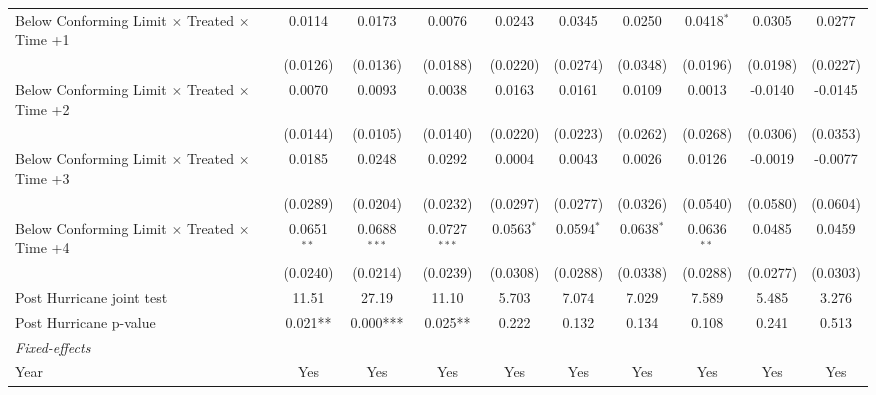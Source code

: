 \begin{tabular}{lccccccccc}
   Below Conforming Limit $\times$ Treated $\times$ Time +1   & 0.0114        & 0.0173         & 0.0076         & 0.0243       & 0.0345       & 0.0250       & 0.0418$^{*}$  & 0.0305         & 0.0277\\   
                                                              & (0.0126)      & (0.0136)       & (0.0188)       & (0.0220)     & (0.0274)     & (0.0348)     & (0.0196)      & (0.0198)       & (0.0227)\\   
   Below Conforming Limit $\times$ Treated $\times$ Time +2   & 0.0070        & 0.0093         & 0.0038         & 0.0163       & 0.0161       & 0.0109       & 0.0013        & -0.0140        & -0.0145\\   
                                                              & (0.0144)      & (0.0105)       & (0.0140)       & (0.0220)     & (0.0223)     & (0.0262)     & (0.0268)      & (0.0306)       & (0.0353)\\   
   Below Conforming Limit $\times$ Treated $\times$ Time +3   & 0.0185        & 0.0248         & 0.0292         & 0.0004       & 0.0043       & 0.0026       & 0.0126        & -0.0019        & -0.0077\\   
                                                              & (0.0289)      & (0.0204)       & (0.0232)       & (0.0297)     & (0.0277)     & (0.0326)     & (0.0540)      & (0.0580)       & (0.0604)\\   
   Below Conforming Limit $\times$ Treated $\times$ Time +4   & 0.0651$^{**}$ & 0.0688$^{***}$ & 0.0727$^{***}$ & 0.0563$^{*}$ & 0.0594$^{*}$ & 0.0638$^{*}$ & 0.0636$^{**}$ & 0.0485         & 0.0459\\   
                                                              & (0.0240)      & (0.0214)       & (0.0239)       & (0.0308)     & (0.0288)     & (0.0338)     & (0.0288)      & (0.0277)       & (0.0303)\\   
   Post Hurricane joint test                                  & 11.51         & 27.19          & 11.10          & 5.703        & 7.074        & 7.029        & 7.589         & 5.485          & 3.276\\  
   Post Hurricane p-value                                     & 0.021**       & 0.000***       & 0.025**        & 0.222        & 0.132        & 0.134        & 0.108         & 0.241          & 0.513\\  
   \midrule
   \emph{Fixed-effects}\\
   Year                                                       & Yes           & Yes            & Yes            & Yes          & Yes          & Yes          & Yes           & Yes            & Yes\\  

\end{tabular}
